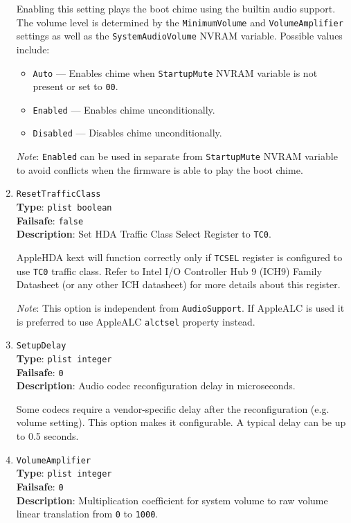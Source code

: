 \documentclass[]{article}
\providecommand{\tightlist}{%
  \setlength{\itemsep}{0pt}\setlength{\parskip}{0pt}}
\begin{document}
\begin{enumerate}
  Enabling this setting plays the boot chime using the builtin audio support. The volume
  level is determined by the \texttt{MinimumVolume} and \texttt{VolumeAmplifier} settings
  as well as the \texttt{SystemAudioVolume} NVRAM variable. Possible values include:

  \begin{itemize}
    \tightlist
    \item \texttt{Auto} --- Enables chime when \texttt{StartupMute} NVRAM variable
      is not present or set to \texttt{00}.
    \item \texttt{Enabled} --- Enables chime unconditionally.
    \item \texttt{Disabled} --- Disables chime unconditionally.
  \end{itemize}

  \emph{Note}: \texttt{Enabled} can be used in separate from \texttt{StartupMute}
  NVRAM variable to avoid conflicts when the firmware is able to play the boot chime.

\item
  \texttt{ResetTrafficClass}\\
  \textbf{Type}: \texttt{plist\ boolean}\\
  \textbf{Failsafe}: \texttt{false}\\
  \textbf{Description}: Set HDA Traffic Class Select Register to \texttt{TC0}.

  AppleHDA kext will function correctly only if \texttt{TCSEL} register is configured
  to use \texttt{TC0} traffic class. Refer to Intel I/O Controller Hub 9 (ICH9) Family
  Datasheet (or any other ICH datasheet) for more details about this register.

  \emph{Note}: This option is independent from \texttt{AudioSupport}. If AppleALC is used
  it is preferred to use AppleALC \texttt{alctsel} property instead.

\item
  \texttt{SetupDelay}\\
  \textbf{Type}: \texttt{plist\ integer}\\
  \textbf{Failsafe}: \texttt{0}\\
  \textbf{Description}: Audio codec reconfiguration delay in microseconds.

  Some codecs require a vendor-specific delay after the reconfiguration
  (e.g. volume setting). This option makes it configurable. A typical
  delay can be up to 0.5 seconds.

\item
  \texttt{VolumeAmplifier}\\
  \textbf{Type}: \texttt{plist\ integer}\\
  \textbf{Failsafe}: \texttt{0}\\
  \textbf{Description}: Multiplication coefficient for system volume to raw volume linear translation
  from \texttt{0} to \texttt{1000}.


\end{enumerate}
\end{document}
